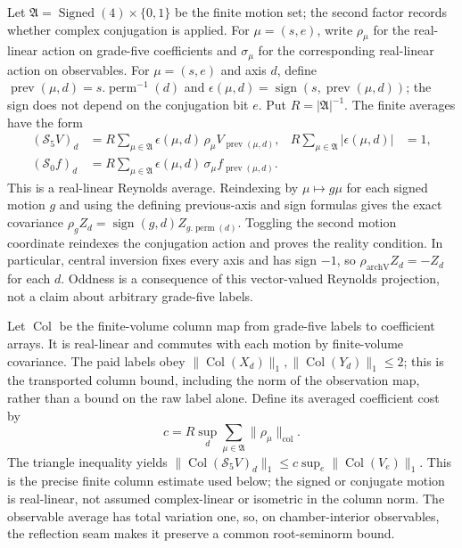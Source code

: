 Let $\mathfrak A=\operatorname{Signed}(4)\times\{0,1\}$ be the finite
motion set; the second factor records whether complex conjugation is
applied. For $\mu=(s,e)$, write $\rho_\mu$ for the real-linear action on
grade-five coefficients and $\sigma_\mu$ for the corresponding real-linear
action on observables. For $\mu=(s,e)$ and axis $d$, define
$\operatorname{prev}(\mu,d)=s.\operatorname{perm}^{-1}(d)$ and
$\epsilon(\mu,d)=\operatorname{sign}(s,\operatorname{prev}(\mu,d))$;
the sign does not depend on the conjugation bit $e$. Put
$R=|\mathfrak A|^{-1}$. The finite averages have the
form
\begin{align}
 (\mathscr S_5 V)_d&=R\sum_{\mu\in\mathfrak A}
     \epsilon(\mu,d)\,\rho_\mu V_{\operatorname{prev}(\mu,d)},
 &R\sum_{\mu\in\mathfrak A}|\epsilon(\mu,d)|&=1,
 \label{eq:ex-trace-probe-coeff-average}\\
 (\mathscr S_0 f)_d&=R\sum_{\mu\in\mathfrak A}
     \epsilon(\mu,d)\,\sigma_\mu f_{\operatorname{prev}(\mu,d)}.
 \label{eq:ex-trace-probe-observable-average}
\end{align}
This is a real-linear Reynolds average. Reindexing by $\mu\mapsto g\mu$
for each signed motion $g$ and using the defining previous-axis and sign
formulas gives the exact covariance
$\rho_g Z_d=\operatorname{sign}(g,d)Z_{g.\operatorname{perm}(d)}$.
Toggling the second motion coordinate reindexes the conjugation action and
proves the reality condition. In particular, central inversion fixes every
axis and has sign $-1$, so $\rho_{\mathrm{archV}}Z_d=-Z_d$ for each $d$.
Oddness is a consequence of this vector-valued Reynolds projection, not a
claim about arbitrary grade-five labels.

Let $\operatorname{Col}$ be the finite-volume column map from grade-five
labels to coefficient arrays. It is real-linear and commutes with each
motion by finite-volume covariance. The paid labels obey
$\|\operatorname{Col}(X_d)\|_1,\|\operatorname{Col}(Y_d)\|_1\leq2$;
this is the transported column bound, including the norm of the observation
map, rather than a bound on the raw label alone. Define its averaged coefficient cost
by
\[
 c=R\sup_d\sum_{\mu\in\mathfrak A}
       \|\rho_\mu\|_{\mathrm{col}}.
\]
The triangle inequality yields
$\|\operatorname{Col}(\mathscr S_5V)_d\|_1\leq
c\sup_e\|\operatorname{Col}(V_e)\|_1$. This is the precise finite
column estimate used below; the signed or conjugate motion is real-linear,
not assumed complex-linear or isometric in the column norm. The observable average has total
variation one, so, on chamber-interior observables, the reflection seam
makes it preserve a common root-seminorm bound.

